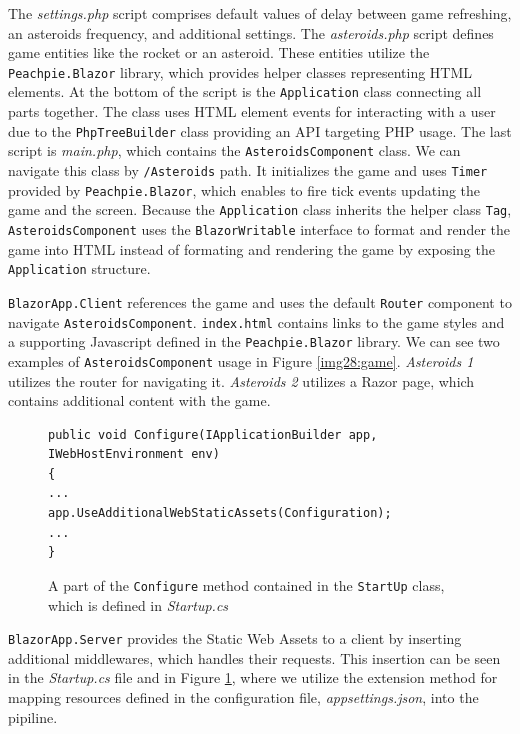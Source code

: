 The \textit{settings.php} script comprises default values of delay between game refreshing, an asteroids frequency, and additional settings.
The \textit{asteroids.php} script defines game entities like the rocket or an asteroid.
These entities utilize the \texttt{Peachpie.Blazor} library, which provides helper classes representing HTML elements.
At the bottom of the script is the \texttt{Application} class connecting all parts together.
The class uses HTML element events for interacting with a user due to the \texttt{PhpTreeBuilder} class providing an API targeting PHP usage.
The last script is \textit{main.php}, which contains the \texttt{AsteroidsComponent} class.
We can navigate this class by \texttt{/Asteroids} path.
It initializes the game and uses \texttt{Timer} provided by \texttt{Peachpie.Blazor}, which enables to fire tick events updating the game and the screen.
Because the \texttt{Application} class inherits the helper class \texttt{Tag}, \texttt{AsteroidsComponent} uses the \texttt{BlazorWritable} interface to format and render the game into HTML instead of formating and rendering the game by exposing the \texttt{Application} structure.
\par
\texttt{BlazorApp.Client} references the game and uses the default \texttt{Router} component to navigate \texttt{AsteroidsComponent}.
\texttt{index.html} contains links to the game styles and a supporting Javascript defined in the \texttt{Peachpie.Blazor} library.
We can see two examples of \texttt{AsteroidsComponent} usage in Figure \ref{img28:game}.
\textit{Asteroids 1} utilizes the router for navigating it.
\textit{Asteroids 2} utilizes a Razor page, which contains additional content with the game.
\par
\begin{figure}
\begin{lstlisting}
public void Configure(IApplicationBuilder app, 
IWebHostEnvironment env)
{
...
app.UseAdditionalWebStaticAssets(Configuration);
...
}
\end{lstlisting}
\caption{A part of the \texttt{Configure} method contained in the \texttt{StartUp} class, which is defined in \textit{Startup.cs}}
\label{img21:server}
\end{figure}
\par
\texttt{BlazorApp.Server} provides the Static Web Assets to a client by inserting additional middlewares, which handles their requests.
This insertion can be seen in the \textit{Startup.cs} file and in Figure \ref{img21:server}, where we utilize the extension method for mapping resources defined in the configuration file, \textit{appsettings.json}, into the pipiline.

